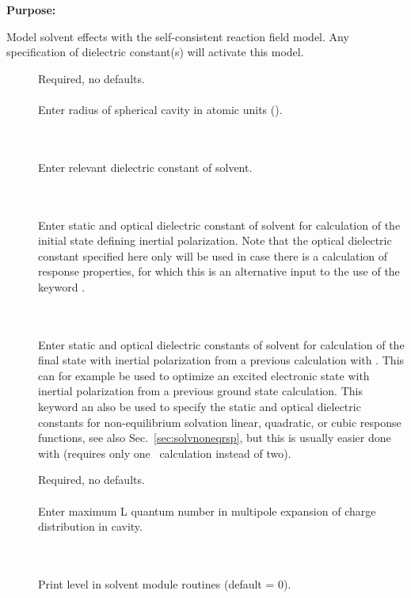 {\bf Purpose:}

Model solvent effects with the self-consistent
reaction field model.
Any specification of dielectric constant(s)
will activate this model.

\begin{description}
\item[]
  Required, no defaults.\\
  \\
  Enter radius of spherical cavity in atomic units (\bohr{}).

\item[] \ \\
  \\
  Enter relevant dielectric constant of solvent.

\item[] \ \\
  \\
  Enter static and optical dielectric constant of solvent for calculation
  of the initial state defining inertial polarization. Note that the optical dielectric constant specified here
  only will be used in case there is a calculation of response
  properties, for which this is an alternative input to the use of the
  keyword .

\item[] \ \\
  \\
  Enter static and optical dielectric constants of solvent
  for calculation of the final state with inertial polarization
  from a previous calculation with . 
  This can for example be used to optimize an excited electronic state
  with inertial polarization from a previous ground state calculation.
  This keyword an  also be used to specify the static and optical dielectric constants
  for non-equilibrium solvation linear, quadratic, or cubic response functions,
  see also Sec.~\ref{sec:solvnoneqrsp}, but this is usually easier done with
   (requires only one \dalton\ calculation instead of two).

\item[]
  Required, no defaults.\\
  \\
  Enter maximum L quantum number in multipole expansion of charge
  distribution in cavity.

\item[] \ \\
   \\
  Print level in solvent module routines (default = 0).
\end{description}

